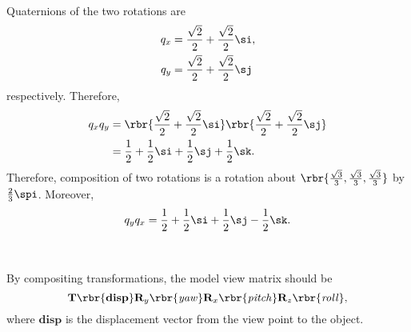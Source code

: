 \documentclass[english, nochinese]{../textmpls/pkupaper}
\begin{document}
\begin{thmquestion}
\
\begin{thmanswer}
Quaternions of the two rotations are
\begin{align}
q_x &= \frac{\sqrt{2}}{2} + \frac{\sqrt{2}}{2} \si, \\
q_y &= \frac{\sqrt{2}}{2} + \frac{\sqrt{2}}{2} \sj
\end{align}
respectively. Therefore,
\begin{equation}
\begin{split}
q_x q_y &= \rbr{ \frac{\sqrt{2}}{2} + \frac{\sqrt{2}}{2} \si } \rbr{ \frac{\sqrt{2}}{2} + \frac{\sqrt{2}}{2} \sj } \\
&= \frac{1}{2} + \frac{1}{2} \si + \frac{1}{2} \sj + \frac{1}{2} \sk.
\end{split}
\end{equation}
Therefore, composition of two rotations is a rotation about $ \rbr{ \frac{\sqrt{3}}{3}, \frac{\sqrt{3}}{3}, \frac{\sqrt{3}}{3} } $ by $ \frac{2}{3} \spi $. Moreover,
\begin{equation}
q_y q_x = \frac{1}{2} + \frac{1}{2} \si + \frac{1}{2} \sj - \frac{1}{2} \sk.
\end{equation}
\end{thmanswer}
\end{thmquestion}

\begin{thmquestion}
\
\begin{thmanswer}
By compositing transformations, the model view matrix should be
\begin{equation}
\mathbf{T} \rbr{\mathbf{disp}} \mathbf{R}_y \rbr{\mathit{yaw}} \mathbf{R}_x \rbr{\mathit{pitch}} \mathbf{R}_z \rbr{\mathit{roll}},
\end{equation}
where $\mathbf{disp}$ is the displacement vector from the view point to the object.
\end{thmanswer}
\end{thmquestion}
\end{document}
